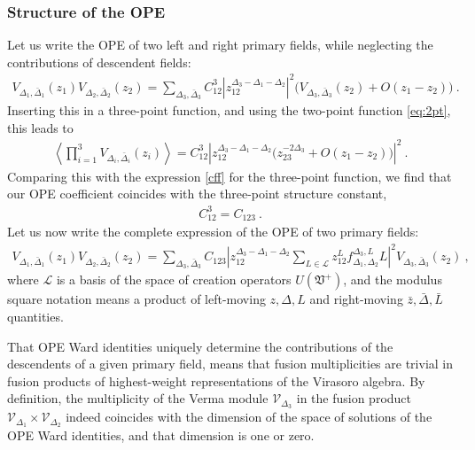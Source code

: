 \documentclass[12pt, a4paper, notitlepage, twoside]{report}
\numberwithin{equation}{section}
\theoremstyle{break}
\begin{document}
\subsubsection{Structure of the OPE}

Let us write the OPE of two left and right primary fields, while neglecting the contributions of descendent fields:
\begin{align}
 V_{\Delta_1,\bar\Delta_1}(z_1) V_{\Delta_2,\bar\Delta_2}(z_2) 
 = 
 \sum_{\Delta_3,\bar\Delta_3} C^{3}_{12}
 \left| z_{12}^{\Delta_3-\Delta_1-\Delta_2}\right|^2 \Big( V_{\Delta_3,\bar\Delta_3}(z_2) + O(z_1-z_2)\Big)\ .
\end{align}
Inserting this in a three-point function, and using the two-point function \eqref{eq:2pt}, this leads to
\begin{align}
 \left<  \prod_{i=1}^3 V_{\Delta_i,\bar\Delta_i}(z_i) \right> 
 = 
 C^3_{12} \left| z_{12}^{\Delta_3-\Delta_1-\Delta_2} \Big( z_{23}^{-2\Delta_3} + O(z_1-z_2) \Big) \right|^2\ .
\end{align}
Comparing this with the expression \eqref{cff} for the three-point function, we find that our OPE coefficient coincides with the three-point structure constant, 
\begin{align}
 C^3_{12}= C_{123}\ .
 \label{cftt}
\end{align}
Let us now write the complete expression of the OPE of two primary fields:
\begin{align}
 \boxed{ V_{\Delta_1,\bar\Delta_1}(z_1) V_{\Delta_2,\bar\Delta_2}(z_2) 
 = 
 \sum_{\Delta_3,\bar\Delta_3} C_{123} \left| z_{12}^{\Delta_3-\Delta_1-\Delta_2}\sum_{L\in\mathcal{L}} z_{12}^Lf^{\Delta_3,L}_{\Delta_1,\Delta_2} L \right|^2 V_{\Delta_3,\bar\Delta_3}(z_2)
 }\ ,
 \label{vvs}
\end{align}
where $\mathcal{L}$ is a basis of the space of creation operators $U(\mathfrak{V}^+)$, and the modulus square notation means a product of left-moving $z,\Delta,L$ and right-moving $\bar z, \bar \Delta, \bar L$ quantities.

That OPE Ward identities uniquely determine the contributions of the descendents of a given primary field, means that fusion multiplicities are trivial in fusion products of highest-weight representations of the Virasoro algebra. By definition, the multiplicity of the Verma module $\mathcal{V}_{\Delta_3}$ in the fusion product $\mathcal{V}_{\Delta_1}\times \mathcal{V}_{\Delta_2}$ indeed coincides with the dimension of the space of solutions of the OPE Ward identities, and that dimension is one or zero.
\end{document}
